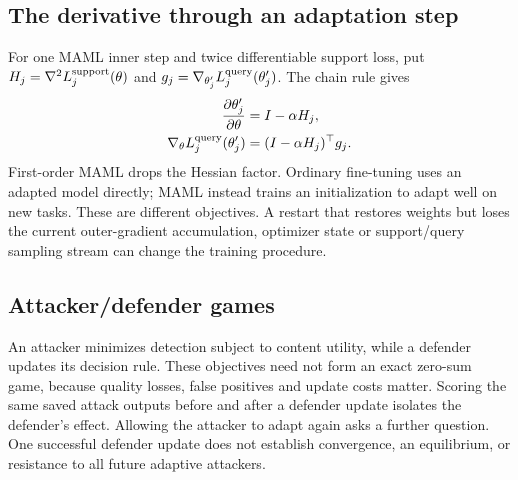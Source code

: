 \subsection{The derivative through an adaptation step}
For one MAML inner step and twice differentiable support loss, put $H_j=\nabla^2 L_j^{\rm support}(\theta)$ and $g_j=\nabla_{\theta'_j}L_j^{\rm query}(\theta'_j)$. The chain rule gives
\begin{align}
 \frac{\partial\theta'_j}{\partial\theta}&=I-\alpha H_j,\\
 \nabla_\theta L_j^{\rm query}(\theta'_j)
 &=(I-\alpha H_j)^\top g_j.
\end{align}
First-order MAML drops the Hessian factor. Ordinary fine-tuning uses an adapted model directly; MAML instead trains an initialization to adapt well on new tasks. These are different objectives. A restart that restores weights but loses the current outer-gradient accumulation, optimizer state or support/query sampling stream can change the training procedure.

\subsection{Attacker/defender games}
An attacker minimizes detection subject to content utility, while a defender updates its decision rule. These objectives need not form an exact zero-sum game, because quality losses, false positives and update costs matter. Scoring the same saved attack outputs before and after a defender update isolates the defender's effect. Allowing the attacker to adapt again asks a further question. One successful defender update does not establish convergence, an equilibrium, or resistance to all future adaptive attackers.


